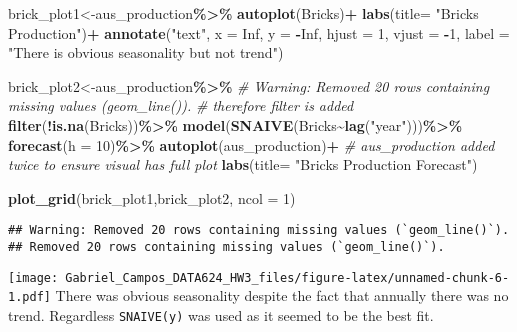 \documentclass[
]{article}
\newenvironment{Shaded}{\begin{snugshade}}{\end{snugshade}}
\newcommand{\AttributeTok}[1]{\textcolor[rgb]{0.13,0.29,0.53}{#1}}
\newcommand{\CommentTok}[1]{\textcolor[rgb]{0.56,0.35,0.01}{\textit{#1}}}
\newcommand{\ConstantTok}[1]{\textcolor[rgb]{0.56,0.35,0.01}{#1}}
\newcommand{\DecValTok}[1]{\textcolor[rgb]{0.00,0.00,0.81}{#1}}
\newcommand{\FunctionTok}[1]{\textcolor[rgb]{0.13,0.29,0.53}{\textbf{#1}}}
\newcommand{\NormalTok}[1]{#1}
\newcommand{\OtherTok}[1]{\textcolor[rgb]{0.56,0.35,0.01}{#1}}
\newcommand{\SpecialCharTok}[1]{\textcolor[rgb]{0.81,0.36,0.00}{\textbf{#1}}}
\newcommand{\StringTok}[1]{\textcolor[rgb]{0.31,0.60,0.02}{#1}}
\begin{document}
\begin{Shaded}
\begin{Highlighting}[]
\NormalTok{brick\_plot1}\OtherTok{\textless{}{-}}\NormalTok{aus\_production}\SpecialCharTok{\%\textgreater{}\%}
                \FunctionTok{autoplot}\NormalTok{(Bricks)}\SpecialCharTok{+}
                \FunctionTok{labs}\NormalTok{(}\AttributeTok{title=} \StringTok{"Bricks Production"}\NormalTok{)}\SpecialCharTok{+}
  \FunctionTok{annotate}\NormalTok{(}\StringTok{"text"}\NormalTok{, }\AttributeTok{x =} \ConstantTok{Inf}\NormalTok{, }\AttributeTok{y =} \SpecialCharTok{{-}}\ConstantTok{Inf}\NormalTok{, }\AttributeTok{hjust =} \DecValTok{1}\NormalTok{, }\AttributeTok{vjust =} \SpecialCharTok{{-}}\DecValTok{1}\NormalTok{,}
           \AttributeTok{label =} \StringTok{"There is obvious seasonality but not trend"}\NormalTok{)}

\NormalTok{brick\_plot2}\OtherTok{\textless{}{-}}\NormalTok{aus\_production}\SpecialCharTok{\%\textgreater{}\%}
\CommentTok{\# Warning: Removed 20 rows containing missing values (\textasciigrave{}geom\_line()\textasciigrave{}).}
\CommentTok{\# therefore filter is added}
  \FunctionTok{filter}\NormalTok{(}\SpecialCharTok{!}\FunctionTok{is.na}\NormalTok{(Bricks))}\SpecialCharTok{\%\textgreater{}\%}
  \FunctionTok{model}\NormalTok{(}\FunctionTok{SNAIVE}\NormalTok{(Bricks}\SpecialCharTok{\textasciitilde{}}\FunctionTok{lag}\NormalTok{(}\StringTok{"year"}\NormalTok{)))}\SpecialCharTok{\%\textgreater{}\%}
    \FunctionTok{forecast}\NormalTok{(}\AttributeTok{h =} \DecValTok{10}\NormalTok{)}\SpecialCharTok{\%\textgreater{}\%}
      \FunctionTok{autoplot}\NormalTok{(aus\_production)}\SpecialCharTok{+}
\CommentTok{\# aus\_production added twice to ensure visual has full plot}
  \FunctionTok{labs}\NormalTok{(}\AttributeTok{title=} \StringTok{"Bricks Production Forecast"}\NormalTok{)}

\FunctionTok{plot\_grid}\NormalTok{(brick\_plot1,brick\_plot2, }\AttributeTok{ncol =} \DecValTok{1}\NormalTok{)}
\end{Highlighting}
\end{Shaded}

\begin{verbatim}
## Warning: Removed 20 rows containing missing values (`geom_line()`).
## Removed 20 rows containing missing values (`geom_line()`).
\end{verbatim}

\texttt{[image: Gabriel\_Campos\_DATA624\_HW3\_files/figure-latex/unnamed-chunk-6-1.pdf]}
There was obvious seasonality despite the fact that annually there was
no trend. Regardless \texttt{SNAIVE(y)} was used as it seemed to be the
best fit.
\end{document}
